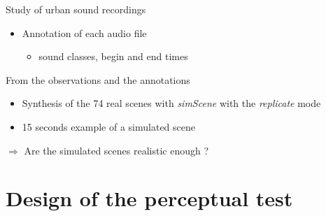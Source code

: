 \documentclass{beamer}
\begin{document}
\begin{frame}{Study of urban sound recordings}
\begin{itemize}
	\item Annotation of each audio file 
	\begin{itemize}
		\item sound classes, begin and end times
	\end{itemize}
	

\end{itemize}

\begin{block}{From the observations and the annotations}
\begin{itemize}
	\item Synthesis of the 74 real scenes with \textit{simScene} with the \textit{replicate} mode
	\item 15 seconds example of a simulated scene\\
	
\centering
{}
	
\end{itemize}
\end{block}
\vspace{0.5cm}
$\Rightarrow$ Are the simulated scenes realistic enough ? 

\end{frame}


\section{Design of the perceptual test}
\end{document}
